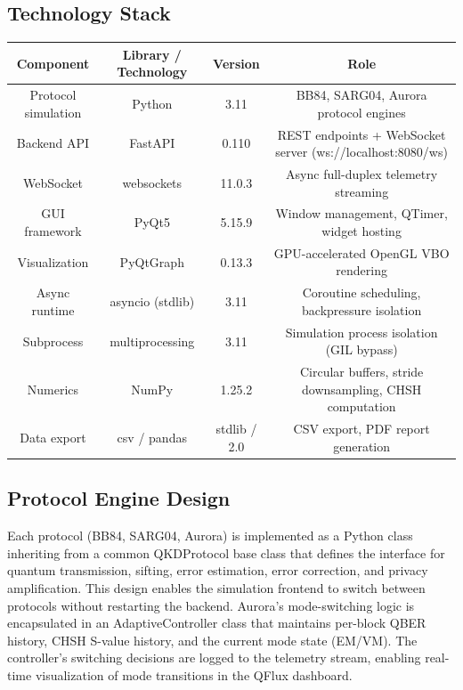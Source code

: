\subsection{Technology Stack}
\begin{table}[hbt!]
\centering
\begin{tabular}{|c|c|c|c|}
\hline
\textbf{Component} & \textbf{Library / Technology} & \textbf{Version} & \textbf{Role} \\
\hline
Protocol simulation & Python & 3.11 & BB84, SARG04, Aurora protocol engines \\
Backend API & FastAPI & 0.110 & REST endpoints + WebSocket server (ws://localhost:8080/ws) \\
WebSocket & websockets & 11.0.3 & Async full-duplex telemetry streaming \\
GUI framework & PyQt5 & 5.15.9 & Window management, QTimer, widget hosting \\
Visualization & PyQtGraph & 0.13.3 & GPU-accelerated OpenGL VBO rendering \\
Async runtime & asyncio (stdlib) & 3.11 & Coroutine scheduling, backpressure isolation \\
Subprocess & multiprocessing & 3.11 & Simulation process isolation (GIL bypass) \\
Numerics & NumPy & 1.25.2 & Circular buffers, stride downsampling, CHSH computation \\
Data export & csv / pandas & stdlib / 2.0 & CSV export, PDF report generation \\
\hline
\end{tabular}
\end{table}

\subsection{Protocol Engine Design}
Each protocol (BB84, SARG04, Aurora) is implemented as a Python class inheriting from a common QKDProtocol base class that defines the interface for quantum transmission, sifting, error estimation, error correction, and privacy amplification. This design enables the simulation frontend to switch between protocols without restarting the backend. Aurora's mode-switching logic is encapsulated in an AdaptiveController class that maintains per-block QBER history, CHSH S-value history, and the current mode state (EM/VM). The controller's switching decisions are logged to the telemetry stream, enabling real-time visualization of mode transitions in the QFlux dashboard.

